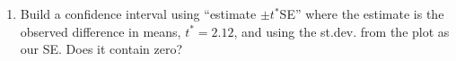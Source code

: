 \begin{enumerate}




\item Build a confidence interval using ``estimate $\pm t^*$SE'' where the
  estimate is the observed difference in means, $t^* = 2.12$, and
  using the st.dev. from the plot as our SE.  Does it contain zero?
 \begin{students}
    \vspace{2cm}    
\end{students}


\end{enumerate}
